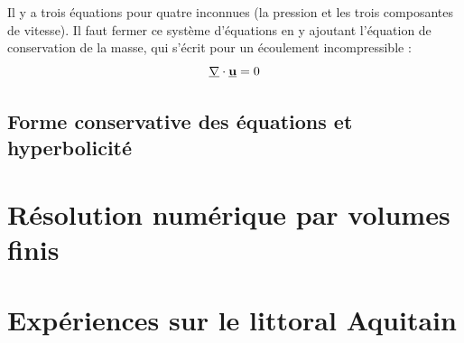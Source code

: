 \documentclass[
a4paper,
11pt,
titlepage,
]{article}
\renewcommand{\vec}[1]{\mathbf{\underline{#1}}}
\begin{document}
Il y a trois équations pour quatre inconnues (la pression et les trois composantes de vitesse). Il faut fermer ce système d'équations en y ajoutant l'équation de conservation de la masse, qui s'écrit pour un écoulement incompressible : 
\begin{equation}
\label{eq:masscons}
\vec{\nabla}\cdot\vec{u} = 0\\	
\end{equation}


\subsection{Forme conservative des équations et hyperbolicité}

\section{Résolution numérique par volumes finis}

\section{Expériences sur le littoral Aquitain}

\newpage

\label{myLastPage}

\newpage

\printbibliography
{}
\end{document}
